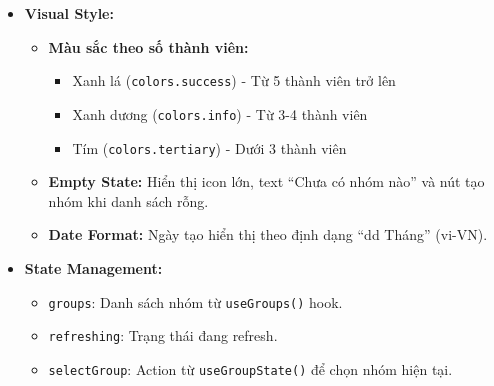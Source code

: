 \begin{itemize}
\begin{itemize}
            \item \textbf{Create Action:} Nhấn \texttt{FAB} gọi \texttt{onCreatePress()} để chuyển đến màn hình tạo nhóm.
            \item \textbf{Pull-to-refresh:} \texttt{RefreshControl} cho phép kéo xuống gọi \texttt{refetch()} để reload danh sách.
        \end{itemize}
    \item \textbf{Visual Style:}
        \begin{itemize}
            \item \textbf{Màu sắc theo số thành viên:}
                \begin{itemize}
                    \item Xanh lá (\texttt{colors.success}) - Từ 5 thành viên trở lên
                    \item Xanh dương (\texttt{colors.info}) - Từ 3-4 thành viên
                    \item Tím (\texttt{colors.tertiary}) - Dưới 3 thành viên
                \end{itemize}
            \item \textbf{Empty State:} Hiển thị icon lớn, text ``Chưa có nhóm nào'' và nút tạo nhóm khi danh sách rỗng.
            \item \textbf{Date Format:} Ngày tạo hiển thị theo định dạng ``dd Tháng'' (vi-VN).
        \end{itemize}
    \item \textbf{State Management:}
        \begin{itemize}
            \item \texttt{groups}: Danh sách nhóm từ \texttt{useGroups()} hook.
            \item \texttt{refreshing}: Trạng thái đang refresh.
            \item \texttt{selectGroup}: Action từ \texttt{useGroupState()} để chọn nhóm hiện tại.
        \end{itemize}
\end{itemize}

